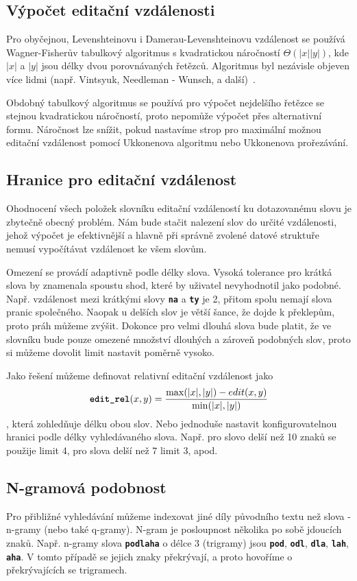 \documentclass[11pt,letterpaper,oneside,openright]{book}
\newcommand{\bftt}[1]{\texttt{\textbf{#1}}}
\begin{document}

\subsection{Výpočet editační vzdálenosti}
Pro obyčejnou, Levenshteinovu i Damerau-Levenshteinovu vzdálenost se používá
Wagner-Fisherův tabulkový algoritmus s kvadratickou náročností
$\Theta(|x||y|)$, kde $|x|$ a $|y|$ jsou délky dvou porovnávaných řetězců.
Algoritmus byl nezávisle objeven více lidmi (např. Vintsyuk, Needleman -
Wunsch, a další)~\cite{Navarro:2001:GTA:375360.375365}.

Obdobný tabulkový algoritmus se používá pro výpočet nejdelšího řetězce se
stejnou kvadratickou náročností, proto nepomůže výpočet přes alternativní
formu. Náročnost lze snížit, pokud nastavíme strop pro maximální možnou
editační vzdálenost pomocí Ukkonenova algoritmu nebo Ukkonenova prořezávání.

\subsection{Hranice pro editační vzdálenost}
Ohodnocení všech položek slovníku editační vzdáleností ku dotazovanému slovu je
zbytečně obecný problém. Nám bude stačit nalezení slov do určité vzdálenosti,
jehož výpočet je efektivnější a hlavně při správně zvolené datové struktuře
nemusí vypočítávat vzdálenost ke všem slovům.

Omezení se provádí adaptivně podle délky slova. Vysoká tolerance pro krátká
slova by znamenala spoustu shod, které by uživatel nevyhodnotil jako podobné.
Např. vzdálenost mezi krátkými slovy \bftt{na} a \bftt{ty} je 2, přitom spolu
nemají slova pranic společného. Naopak u delších slov je větší šance, že dojde
k překlepům, proto práh můžeme zvýšit. Dokonce pro velmi dlouhá slova bude
platit, že ve slovníku bude pouze omezené množství dlouhých a zároveň podobných
slov, proto si můžeme dovolit limit nastavit poměrně vysoko.

Jako řešení můžeme definovat relativní editační vzdálenost jako
\[\bftt{edit\_rel}(x, y) = \frac{\max (|x|, |y|) - edit(x, y)}{\min (|x|,
|y|)}\], která zohledňuje délku obou slov. Nebo jednoduše nastavit
konfigurovatelnou hranici podle délky vyhledávaného slova. Např. pro slovo
delší než 10 znaků se použije limit 4, pro slova delší než 7 limit 3, apod.




\subsection{N-gramová podobnost}
Pro přibližné vyhledávání můžeme indexovat jiné díly původního textu než slova
- n-gramy (nebo také q-gramy). N-gram je posloupnost několika po sobě jdoucích
znaků. Např. n-gramy slova \bftt{podlaha} o délce 3 (trigramy) jsou \bftt{pod},
\bftt{odl}, \bftt{dla}, \bftt{lah}, \bftt{aha}. V tomto případě se jejich znaky
překrývají, a proto hovoříme o překrývajících se trigramech.
\end{document}
